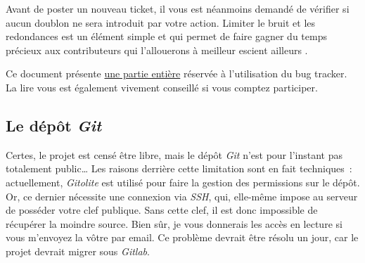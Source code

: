 Avant de poster un nouveau ticket, il vous est néanmoins demandé de vérifier si aucun doublon ne sera introduit par votre action.
 Limiter le bruit et les redondances est un élément simple et qui permet de faire gagner du temps précieux aux contributeurs qui l'allouerons à meilleur escient ailleurs \smiley.

Ce document présente \hyperref[sec:contribution_bt]{une partie entière} réservée à l'utilisation du bug tracker.
La lire vous est également vivement conseillé si vous comptez participer.

\subsection{Le dépôt \emph{Git}}
Certes, le projet est censé être libre, mais le dépôt \emph{Git} n'est pour l'instant pas totalement public\dots{}
Les raisons derrière cette limitation sont en fait techniques~: actuellement, \emph{Gitolite} est utilisé pour faire la gestion des permissions sur le dépôt.
Or, ce dernier nécessite une connexion via \emph{SSH}, qui, elle-même impose au serveur de posséder votre clef publique.
Sans cette clef, il est donc impossible de récupérer la moindre source.
Bien sûr, je vous donnerais les accès en lecture si vous m'envoyez la vôtre par email.
Ce problème devrait être résolu un jour, car le projet devrait migrer sous \emph{Gitlab}.
